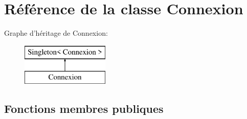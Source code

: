 \hypertarget{class_connexion}{\section{Référence de la classe Connexion}
\label{class_connexion}
}
Graphe d'héritage de Connexion\+:\begin{figure}[H]
\begin{center}
\leavevmode
\includegraphics[height=2.000000cm]{class_connexion}
\end{center}
\end{figure}
\subsection*{Fonctions membres publiques}
